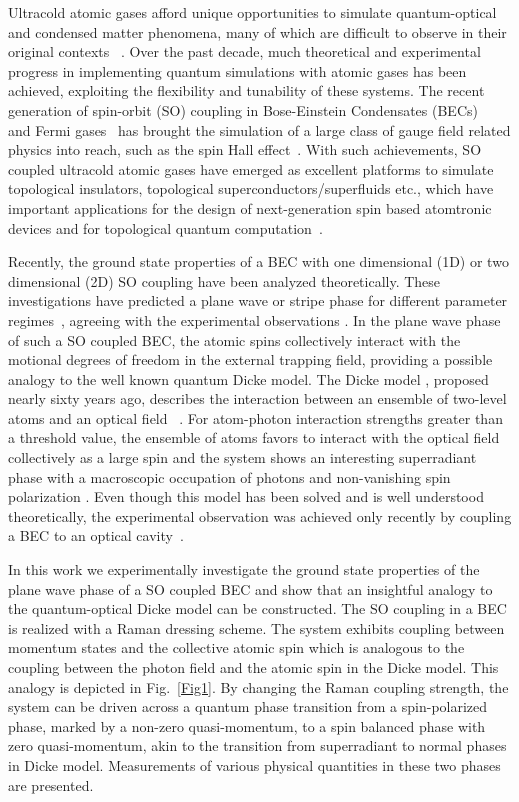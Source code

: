\documentclass[prl,aps,twocolumn,floatfix]{revtex4}
\begin{document}
Ultracold atomic gases afford unique opportunities to simulate
quantum-optical and condensed matter phenomena, many of which are difficult
to observe in their original contexts ~\cite{Bloch1,Bloch2}. Over the past
decade, much theoretical and experimental progress in implementing quantum
simulations with atomic gases has been achieved, exploiting the flexibility
and tunability of these systems. The recent generation of spin-orbit (SO)
coupling in Bose-Einstein Condensates (BECs)~\cite{Ian,Pan,Peter,Chen} and
Fermi gases~\cite{Zhang,Martin,Ian4} has brought the simulation of a large
class of gauge field related physics into reach, such as the spin Hall
effect~\cite{Ian2,Ian3, Bloch3,Ketterle}. With such achievements, SO coupled
ultracold atomic gases have emerged as excellent platforms to simulate
topological insulators, topological superconductors/superfluids etc., which
have important applications for the design of next-generation spin based
atomtronic devices and for topological quantum computation~\cite{Kane,Qi}.

Recently, the ground state properties of a BEC with one dimensional (1D) or
two dimensional (2D) SO coupling have been analyzed theoretically. These
investigations have predicted a plane wave or stripe phase for different
parameter regimes~\cite{Zhai,Wu,Ho2,Sinha,Yongping2,Hu,Stringari}, agreeing
with the experimental observations \cite{Ian}.  In the plane wave phase of
such a SO coupled BEC, the atomic spins collectively interact with the
motional degrees of freedom in the external trapping field, providing a
possible analogy to the well known quantum Dicke model. The Dicke model
\cite{Dicke}, proposed nearly sixty years ago, describes the interaction
between an ensemble of two-level atoms and an optical field~\cite{Esslinger}%
. For atom-photon interaction strengths greater than a threshold value, the
ensemble of atoms favors to interact with the optical field collectively as
a large spin and the system shows an interesting superradiant phase with a
macroscopic occupation of photons and non-vanishing spin polarization \cite%
{Hepp,Wang,Gross}. Even though this model has been solved and is well
understood theoretically, the experimental observation was achieved only
recently by coupling a BEC to an optical cavity~\cite{Baumann}.

In this work we experimentally investigate the ground state properties of
the plane wave phase of a SO coupled BEC and show that an insightful
analogy to the quantum-optical Dicke model can be constructed. The SO
coupling in a BEC is realized with a Raman dressing scheme. The system
exhibits coupling between momentum states and the collective atomic spin
which is analogous to the coupling between the photon field and the atomic
spin in the Dicke model. This analogy is depicted in Fig.~\ref{Fig1}. By
changing the Raman coupling strength, the system can be driven across a
quantum phase transition from a spin-polarized phase, marked by a non-zero
quasi-momentum, to a spin balanced phase with zero quasi-momentum, akin to
the transition from superradiant to normal phases in Dicke model.
Measurements of various physical quantities in these two phases are
presented.
\end{document}
